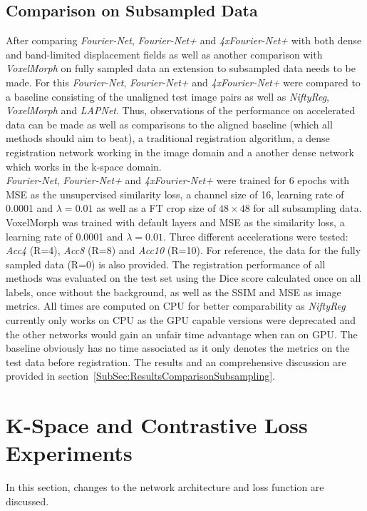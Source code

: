 \documentclass[english,version-2022-01]{uzl-thesis} %
\begin{document}
\subsection{Comparison on Subsampled Data} \label{SubSec:ComparisonSubsampling}
After comparing \emph{Fourier-Net}, \emph{Fourier-Net+} and \emph{4xFourier-Net+} with both dense and band-limited displacement fields as well as another comparison with \emph{VoxelMorph} on fully sampled data 
an extension to subsampled data needs to be made. For this \emph{Fourier-Net}, \emph{Fourier-Net+} and \emph{4xFourier-Net+} were compared to a baseline consisting of the unaligned test image pairs as well as \emph{NiftyReg}, \emph{VoxelMorph} and \emph{LAPNet}. Thus, observations of the performance on accelerated data can be made as well as comparisons to the aligned baseline (which all methods should aim to beat), a traditional registration algorithm, a dense registration network working in the image domain and a another dense network which works in the k-space domain.\\
\emph{Fourier-Net}, \emph{Fourier-Net+} and \emph{4xFourier-Net+} were trained for 6 epochs with MSE as the unsupervised similarity loss, a channel size of 16, learning rate of 0.0001 and $\lambda=0.01$ as well as a FT crop size of $48 \times 48$ for all subsampling data. VoxelMorph was trained with default layers and MSE as the similarity loss, a learning rate of 0.0001 and $\lambda=0.01$. Three different accelerations were tested: \textit{Acc4} (R=4), \textit{Acc8} (R=8) and \textit{Acc10} (R=10). For reference, the data for the fully sampled data (R=0) is also provided. The registration performance of all methods was evaluated on the test set using the Dice score calculated once on all labels, once without the background, as well as the SSIM and MSE as image metrics. All times are computed on CPU for better comparability as \emph{NiftyReg} currently only works on CPU as the GPU capable versions were deprecated and the other networks would gain an unfair time advantage when ran on GPU. The baseline obviously has no time associated as it only denotes the metrics on the test data before registration. The results and an comprehensive discussion are provided in section~\ref{SubSec:ResultsComparisonSubsampling}.


\section{K-Space and Contrastive Loss Experiments}
In this section, changes to the network architecture and loss function are discussed.
\end{document}
